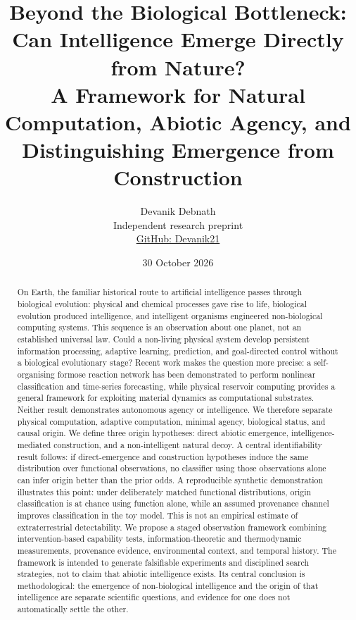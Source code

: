 \documentclass[11pt]{article}
\title{\vspace{-1.15em}\textbf{Beyond the Biological Bottleneck: Can Intelligence Emerge Directly from Nature?}\\[0.35em]
\large A Framework for Natural Computation, Abiotic Agency, and Distinguishing Emergence from Construction}
\author{Devanik Debnath\\\small Independent research preprint\\\small \href{https://github.com/Devanik21}{GitHub: Devanik21}}
\date{30 October 2026}
\begin{document}
\maketitle

\begin{abstract}
On Earth, the familiar historical route to artificial intelligence passes through biological evolution: physical and chemical processes gave rise to life, biological evolution produced intelligence, and intelligent organisms engineered non-biological computing systems. This sequence is an observation about one planet, not an established universal law. Could a non-living physical system develop persistent information processing, adaptive learning, prediction, and goal-directed control without a biological evolutionary stage? Recent work makes the question more precise: a self-organising formose reaction network has been demonstrated to perform nonlinear classification and time-series forecasting, while physical reservoir computing provides a general framework for exploiting material dynamics as computational substrates. Neither result demonstrates autonomous agency or intelligence. We therefore separate physical computation, adaptive computation, minimal agency, biological status, and causal origin. We define three origin hypotheses: direct abiotic emergence, intelligence-mediated construction, and a non-intelligent natural decoy. A central identifiability result follows: if direct-emergence and construction hypotheses induce the same distribution over functional observations, no classifier using those observations alone can infer origin better than the prior odds. A reproducible synthetic demonstration illustrates this point: under deliberately matched functional distributions, origin classification is at chance using function alone, while an assumed provenance channel improves classification in the toy model. This is not an empirical estimate of extraterrestrial detectability. We propose a staged observation framework combining intervention-based capability tests, information-theoretic and thermodynamic measurements, provenance evidence, environmental context, and temporal history. The framework is intended to generate falsifiable experiments and disciplined search strategies, not to claim that abiotic intelligence exists. Its central conclusion is methodological: the emergence of non-biological intelligence and the origin of that intelligence are separate scientific questions, and evidence for one does not automatically settle the other.
\end{abstract}
\end{document}
